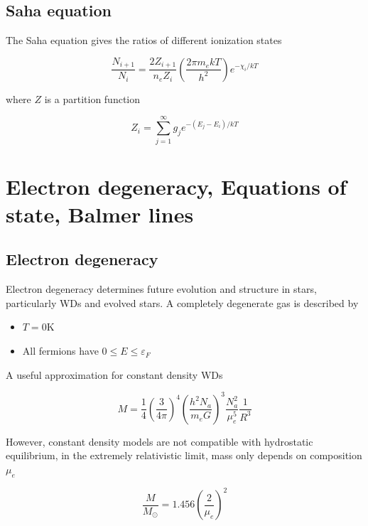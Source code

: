 \documentclass{article}
\begin{document}
\subsection{Saha equation}

The Saha equation gives the ratios of different ionization states

\begin{equation}
    \frac{N_{i+1}}{N_i} = \frac{2Z_{i+1}}{n_eZ_i}\left(\frac{2\pi m_ekT}{h^2}\right)e^{-\chi_i/kT}
\end{equation}

where $Z$ is a partition function

\begin{equation}
    Z_i = \sum_{j=1}^\infty g_je^{-(E_j - E_i)/kT}
\end{equation}

\section{Electron degeneracy, Equations of state, Balmer lines}

\subsection{Electron degeneracy}

Electron degeneracy determines future evolution and structure in stars, particularly WDs and evolved stars. A completely degenerate gas is described by

\begin{itemize}
    \item $T = 0$K

    \item All fermions have $0 \le E \le \varepsilon_F$
\end{itemize}

A useful approximation for constant density WDs

\begin{equation}
    M = \frac{1}{4}\left(\frac{3}{4\pi}\right)^4\left(\frac{h^2 N_a}{m_e G}\right)^3\frac{N_a^2}{\mu_e^5}\frac{1}{R^3}
\end{equation}

However, constant density models are not compatible with hydrostatic equilibrium, in the extremely relativistic limit, mass only depends on composition $\mu_e$

\begin{equation}
    \frac{M}{M_\odot} = 1.456\left(\frac{2}{\mu_e}\right)^2
\end{equation}
\end{document}
